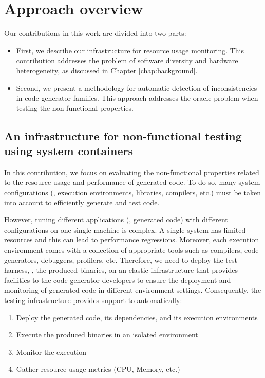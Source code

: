 \section{Approach overview}
\label{sec:cd_approach}
Our contributions in this work are divided into two parts:
\begin{itemize}
	\item First, we describe our infrastructure for resource usage monitoring. 
	This contribution addresses the problem of software diversity and hardware heterogeneity, as discussed in Chapter \ref{chap:background}.
	
	\item Second, we present a methodology for automatic detection of inconsistencies in code generator families. This approach addresses the oracle problem when testing the non-functional properties.
\end{itemize}


\subsection{An infrastructure for non-functional testing using system containers}
\label{sec:cg-An infrastructure for non-functional testing using system containers}
In this contribution, we focus on evaluating the non-functional properties related to the resource usage and performance of generated code. To do so, many system configurations (\ie, execution environments, libraries, compilers, etc.) must be taken into account to efficiently generate and test code. 

However, tuning different applications (\ie, generated code) with different configurations on one single machine is complex. A single system has limited resources and this can lead to performance regressions. Moreover, each execution environment comes with a collection of appropriate tools such as compilers, code generators, debuggers, profilers, etc. Therefore, we need to deploy the test harness, \ie, the produced binaries, on an elastic infrastructure that provides facilities to the code generator developers to ensure the deployment and monitoring of generated code in different environment settings. 
Consequently, the testing infrastructure provides support to automatically:
\begin{enumerate}
	\item Deploy the generated code, its dependencies, and its execution environments
	\item Execute the produced binaries in an isolated environment 
	\item Monitor the execution 
	\item Gather resource usage metrics (CPU, Memory, etc.)
\end{enumerate}

